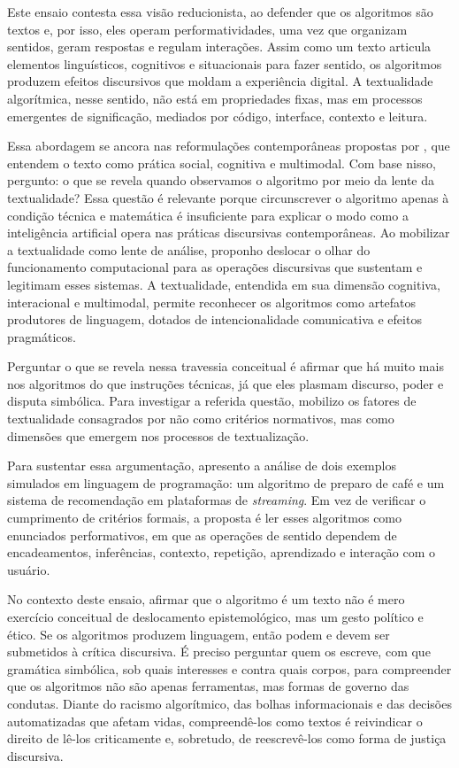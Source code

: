 \documentclass[portuguese]{textolivre}
\begin{document}
Este ensaio contesta essa visão reducionista, ao defender que os algoritmos são textos e, por isso, eles operam performatividades, uma vez que organizam sentidos, geram respostas e regulam interações. Assim como um texto articula elementos linguísticos, cognitivos e situacionais para fazer sentido, os algoritmos produzem efeitos discursivos que moldam a experiência digital. A textualidade algorítmica, nesse sentido, não está em propriedades fixas, mas em processos emergentes de significação, mediados por código, interface, contexto e leitura.

Essa abordagem se ancora nas reformulações contemporâneas propostas por \textcite{beaugrande1997,koch2006,marcuschi2008}, que entendem o texto como prática social, cognitiva e multimodal. Com base nisso, pergunto: o que se revela quando observamos o algoritmo por meio da lente da textualidade? Essa questão é relevante porque circunscrever o algoritmo apenas à condição técnica e matemática é insuficiente para explicar o modo como a inteligência artificial opera nas práticas discursivas contemporâneas. Ao mobilizar a textualidade como lente de análise, proponho deslocar o olhar do funcionamento computacional para as operações discursivas que sustentam e legitimam esses sistemas. A textualidade, entendida em sua dimensão cognitiva, interacional e multimodal, permite reconhecer os algoritmos como artefatos produtores de linguagem, dotados de intencionalidade comunicativa e efeitos pragmáticos.

Perguntar o que se revela nessa travessia conceitual é afirmar que há muito mais nos algoritmos do que instruções técnicas, já que eles plasmam discurso, poder e disputa simbólica. Para investigar a referida questão, mobilizo os fatores de textualidade consagrados por \textcite{halliday1976,beaugrande1981} não como critérios normativos, mas como dimensões que emergem nos processos de textualização.

Para sustentar essa argumentação, apresento a análise de dois exemplos simulados em linguagem de programação: um algoritmo de preparo de café e um sistema de recomendação em plataformas de \textit{streaming}. Em vez de verificar o cumprimento de critérios formais, a proposta é ler esses algoritmos como enunciados performativos, em que as operações de sentido dependem de encadeamentos, inferências, contexto, repetição, aprendizado e interação com o usuário.

No contexto deste ensaio, afirmar que o algoritmo é um texto não é mero exercício conceitual de deslocamento epistemológico, mas um gesto político e ético. Se os algoritmos produzem linguagem, então podem e devem ser submetidos à crítica discursiva. É preciso perguntar quem os escreve, com que gramática simbólica, sob quais interesses e contra quais corpos, para compreender que os algoritmos não são apenas ferramentas, mas formas de governo das condutas. Diante do racismo algorítmico, das bolhas informacionais e das decisões automatizadas que afetam vidas, compreendê-los como textos é reivindicar o direito de lê-los criticamente e, sobretudo, de reescrevê-los como forma de justiça discursiva.
\end{document}
